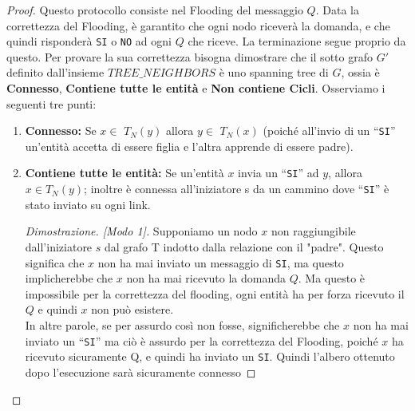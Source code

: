 \begin{proof}
    Questo protocollo consiste nel Flooding del messaggio $Q$. Data la
    correttezza del Flooding, è garantito che ogni nodo riceverà la domanda, e
    che quindi risponderà \texttt{SI} o \texttt{NO} ad ogni $Q$ che riceve. La terminazione segue
    proprio da questo. Per provare la sua correttezza bisogna dimostrare che il
    sotto grafo $G'$ definito dall'insieme $TREE\_NEIGHBORS$ è uno spanning tree
    di $G$, ossia è \textbf{Connesso}, \textbf{Contiene tutte le entità} e
    \textbf{Non contiene Cicli}. Osserviamo i seguenti tre punti:
    \begin{enumerate}
        \item \textbf{Connesso:} Se $x \in$ $T_N(y)$ allora $y \in$ $T_N(x)$
              (poiché all'invio di un ``\texttt{SI}'' un'entità accetta di
              essere figlia e l'altra apprende di essere padre).
        \item \textbf{Contiene tutte le entità:} Se un'entità $x$ invia un ``\texttt{SI}''
              ad $y$, allora $x \in T_N(y)$; inoltre è connessa all'iniziatore s
              da un cammino dove ``\texttt{SI}'' è stato inviato su ogni link.
              \begin{proof}[Dimostrazione. \textit{[Modo 1]}]
                  Supponiamo un nodo $x$ non raggiungibile dall'iniziatore $s$
                  dal grafo T indotto dalla relazione con il "padre". Questo
                  significa che $x$ non ha mai inviato un messaggio di \texttt{SI}, ma
                  questo implicherebbe che $x$ non ha mai ricevuto la domanda
                  $Q$. Ma questo è impossibile per la correttezza del flooding,
                  ogni entità ha per forza ricevuto il $Q$ e quindi $x$ non può
                  esistere.\\

                  In altre parole, se per assurdo
                  così non fosse, significherebbe che $x$ non ha mai inviato un
                  ``\texttt{SI}'' ma ciò è assurdo per la correttezza del
                  Flooding, poiché $x$ ha ricevuto sicuramente Q, e quindi ha
                  inviato un \texttt{SI}. Quindi l'albero ottenuto dopo
                  l'esecuzione sarà sicuramente connesso


\end{proof}
\end{enumerate}
\end{proof}
